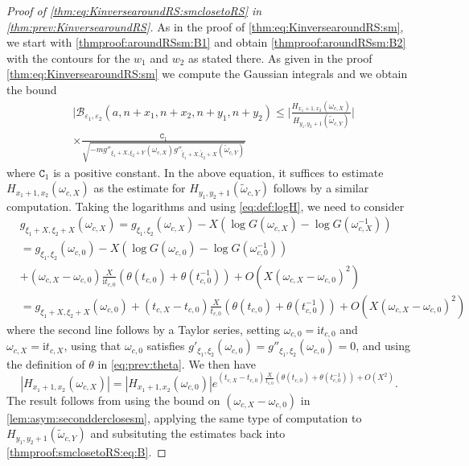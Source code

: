 \documentclass[11pt,twoside]{amsart}
\theoremstyle{plain}
\numberwithin{quest}{section}
\theoremstyle{remark}
\numberwithin{rem}{section}
\theoremstyle{definition}
\newcommand{\eps}{\varepsilon}
\begin{document}
\begin{proof}[Proof of \eqref{thm:eq:KinversearoundRS:smclosetoRS} in \cref{thm:prev:KinversearoundRS}]
		As in the proof of \eqref{thm:eq:KinversearoundRS:sm}, we start with \eqref{thmproof:aroundRSsm:B1} and obtain \eqref{thmproof:aroundRSsm:B2} with the contours for the $w_1$ and $w_2$ as stated there. As given in the proof \eqref{thm:eq:KinversearoundRS:sm} we compute the Gaussian integrals and we obtain the bound
		\begin{equation} \label{thmproof:smclosetoRS:eq:B}
			\begin{split}
				&|\mathcal{B}_{\eps_1,\eps_2}(a,n+x_1,n+x_2,n+y_1,n+y_2) \leq \bigg| \frac{H_{x_1+1,x_2}(\omega_{c,X})}{H_{y_1,y_2+1}(\tilde{\omega}_{c,Y})}\bigg| \\&\times \frac{\mathtt{C}_1}{\sqrt{-mg''_{\xi_1+X,\xi_2+Y}(\omega_{c,X}) g''_{\tilde{\xi}_1+X,\tilde{\xi}_2+X}(\tilde{\omega}_{c,Y}) }}
			\end{split}
		\end{equation}
		where $\mathtt{C}_1$ is a positive constant.
		In the above equation, it suffices to estimate $H_{x_1+1,x_2}(\omega_{c,X})$ as the estimate for $H_{y_1,y_2+1}(\tilde{\omega}_{c,Y})$ follows by a similar computation.  Taking the logarithms and using \eqref{eq:def:logH}, we need to consider
		\begin{equation*}
			\begin{split}
				&g_{\xi_1+X,\xi_2+X}(\omega_{c,X})=g_{\xi_1,\xi_2}(\omega_{c,X}) -X (\log G(\omega_{c,X})-\log G(\omega_{c,X}^{-1}))\\
				&=g_{\xi_1,\xi_2}(\omega_{c,0}) -X(\log G(\omega_{c,0})-\log G(\omega_{c,0}^{-1}))\\ 
				&+(\omega_{c,X}-\omega_{c,0})\frac{X}{\mathrm{i}t_{c,0}}(\theta(t_{c,0})+\theta(t_{c,0}^{-1}))+O(X (\omega_{c,X}-\omega_{c,0})^2)\\
				&=g_{\xi_1+X,\xi_2+X}(\omega_{c,0}) +(t_{c,X}-t_{c,0})\frac{X}{t_{c,0}}(\theta(t_{c,0})+\theta(t_{c,0}^{-1}))+O(X  (\omega_{c,X}-\omega_{c,0})^2)
			\end{split}
		\end{equation*}
		where the second line follows by a Taylor series, setting $\omega_{c,0}=\mathrm{i}t_{c,0}$ and $\omega_{c,X}=\mathrm{i}t_{c,X}$, using that $\omega_{c,0}$ satisfies $g'_{\xi_1,\xi_2}(\omega_{c,0})=g''_{\xi_1,\xi_2}(\omega_{c,0})=0$, and using the definition of $\theta$ in \eqref{eq:prev:theta}. We then have
		\begin{equation*}
			|H_{x_1+1,x_2}(\omega_{c,X})|=|H_{x_1+1,x_2}(\omega_{c,0})| e^{(t_{c,X}-t_{c,0})\frac{X}{t_{c,0}} (\theta(t_{c,0})+\theta(t_{c,0}^{-1}))+O(X^2)}.
		\end{equation*}
		The result follows from using the bound on $(\omega_{c,X}-\omega_{c,0})$ in \cref{lem:asym:secondderclosesm}, applying the same type of computation to ${H_{y_1,y_2+1}(\tilde{\omega}_{c,Y})}$ and subsituting the estimates back into \eqref{thmproof:smclosetoRS:eq:B}.
		

\end{proof}
\end{document}
